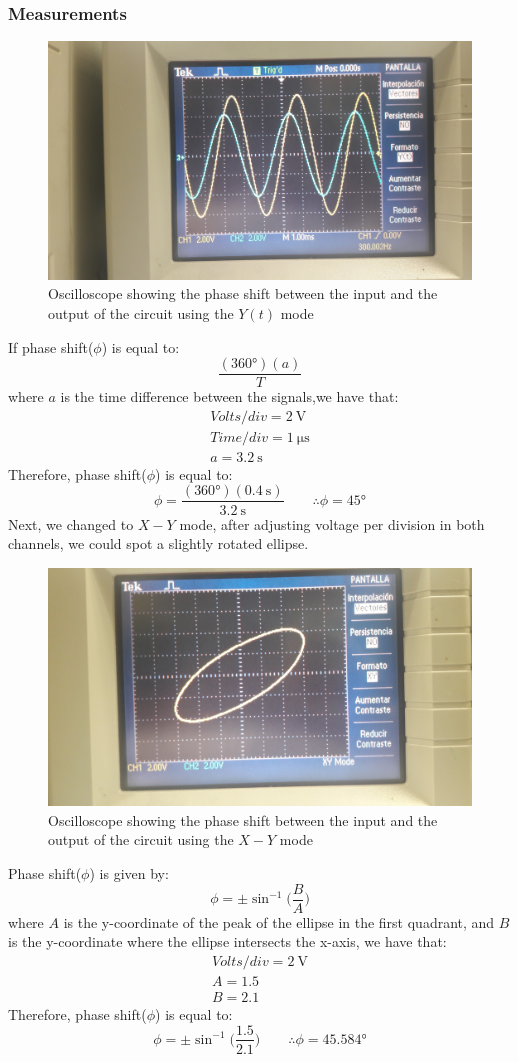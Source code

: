 \documentclass[letterpaper]{article}
\begin{document}
\subsubsection{Measurements}
\begin{figure}[H]
    \centering
    \includegraphics[width=.7\linewidth,angle=180]{img/part4/5}
    \caption{Oscilloscope showing the phase shift between the input and the output of the circuit
    using the $Y(t)$ mode}
\end{figure}
If phase shift($\phi$) is equal to:
\[\frac{(\ang{360})(a)}{T}\]
where $a$ is the time difference between the signals,we have that:
\begin{gather*}
    Volts/div = \SI{2}{\volt}\\
    Time/div = \SI{1}{\micro\second}\\
    a = \SI{3.2}{\second}
\end{gather*}
Therefore, phase shift($\phi$) is equal to:
\[\phi=\frac{(\ang{360})(\SI{0.4}{\second})}{\SI{3.2}{\second}}\qquad\therefore\phi=\ang{45}\]
Next, we changed to $X-Y$
mode, after adjusting voltage per division in both channels, we could spot a slightly rotated ellipse.
\begin{figure}[H]
    \centering
    \includegraphics[width=.7\linewidth,angle=180]{img/part4/6}
    \caption{Oscilloscope showing the phase shift between the input and the output of the circuit
    using the $X-Y$ mode}
\end{figure}
Phase shift($\phi$) is given by:
\[\phi=\pm\sin^{-1}\Big(\frac{B}{A}\Big)\]
where $A$ is the y-coordinate of the peak of the ellipse in the first quadrant, and $B$ is the
y-coordinate where the ellipse intersects the x-axis, we have that:
\begin{gather*}
    Volts/div = \SI{2}{\volt}\\
    A = 1.5\\
    B = 2.1
\end{gather*}
Therefore, phase shift($\phi$) is equal to:
\[\phi=\pm\sin^{-1}\Big(\frac{1.5}{2.1}\Big)\qquad\therefore\phi=\ang{45.584}\]
\end{document}
